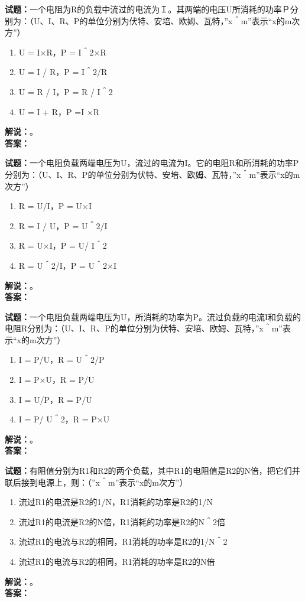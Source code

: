 \documentclass{ctexbook}
\begin{document}
\bigskip




\noindent\textbf{试题：}一个电阻为R的负载中流过的电流为Ｉ。其两端的电压U所消耗的功率Ｐ分别为：（U、I、R、P的单位分别为伏特、安培、欧姆、瓦特，”x＾m”表示“x的m次方”）
\begin{enumerate}[leftmargin=3em]
\item U = I×R，P = I＾2×R
\item U = I / R，P = I＾2/R
\item U = R / I，P = R / I＾2
\item U = I + R，P =I ×R
\end{enumerate}
\noindent\textbf{解说：}\textbf{}。\\\noindent\textbf{答案：}

\bigskip




\noindent\textbf{试题：}一个电阻负载两端电压为U，流过的电流为I。它的电阻R和所消耗的功率P分别为：（U、I、R、P的单位分别为伏特、安培、欧姆、瓦特，”x＾m”表示“x的m次方”）
\begin{enumerate}[leftmargin=3em]
\item R = U/I，P = U×I
\item R = I / U，P = U＾2/I
\item R = U×I，P = U/ I＾2
\item R = U＾2/I，P = U＾2×I
\end{enumerate}
\noindent\textbf{解说：}\textbf{}。\\\noindent\textbf{答案：}

\bigskip




\noindent\textbf{试题：}一个电阻负载两端电压为U，所消耗的功率为P。流过负载的电流I和负载的电阻R分别为：（U、I、R、P的单位分别为伏特、安培、欧姆、瓦特，”x＾m”表示“x的m次方”）
\begin{enumerate}[leftmargin=3em]
\item I = P/U，R = U＾2/P
\item I = P×U，R = P/U
\item I = U/P，R = P/U
\item I = P/ U＾2，R = P×U
\end{enumerate}
\noindent\textbf{解说：}\textbf{}。\\\noindent\textbf{答案：}

\bigskip




\noindent\textbf{试题：}有阻值分别为R1和R2的两个负载，其中R1的电阻值是R2的N倍，把它们并联后接到电源上，则：（”x＾m”表示“x的m次方”）
\begin{enumerate}[leftmargin=3em]
\item 流过R1的电流是R2的1/N，R1消耗的功率是R2的1/N
\item 流过R1的电流是R2的N倍，R1消耗的功率是R2的N＾2倍
\item 流过R1的电流与R2的相同，R1消耗的功率是R2的1/N＾2
\item 流过R1的电流与R2的相同，R1消耗的功率是R2的N倍
\end{enumerate}
\noindent\textbf{解说：}\textbf{}。\\\noindent\textbf{答案：}
\end{document}
